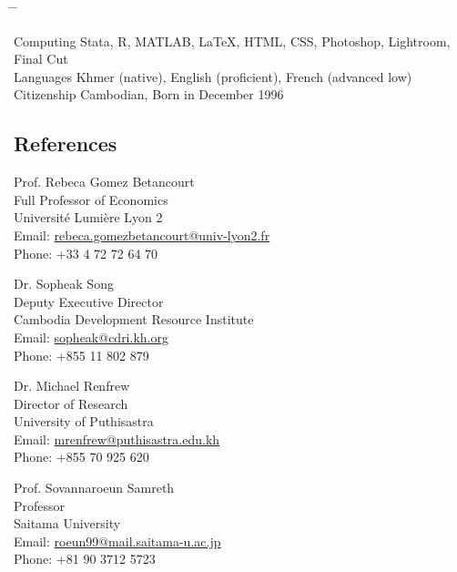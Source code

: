 \documentclass[10pt,a4paper]{article}
\newcommand{\tabbedblock}[1]{

	\begin{tabbing}
		\hspace{2cm} \= \hspace{4cm} \= \kill
		#1
	\end{tabbing}
}
\begin{document}
\tabbedblock{
	Computing \> Stata, R, MATLAB, \LaTeX, HTML, CSS, Photoshop, Lightroom, Final Cut\\
	
	Languages \> Khmer (native), English (proficient), French (advanced low)\\
	
	Citizenship \> Cambodian, Born in December 1996
}


\subsection*{References}		

\parbox{0.5\textwidth}{ %
	Prof. Rebeca Gomez Betancourt\\ 
	Full Professor of Economics\\ 
	Université Lumière Lyon 2\\
	Email: \href{mailto: Phone: rebeca.gomezbetancourt@univ-lyon2.fr}{rebeca.gomezbetancourt@univ-lyon2.fr}\\
	Phone: +33 4 72 72 64 70
}
\hfill %
\parbox{0.5\textwidth}{ %
	Dr. Sopheak Song\\ 
	Deputy Executive Director \\
	Cambodia Development Resource Institute\\ 
	Email: \href{mailto: sopheak@cdri.kh.org}{sopheak@cdri.kh.org}\\
	Phone: +855 11 802 879
}

\vspace{1.5em}

\parbox{0.5\textwidth}{ %
	Dr. Michael Renfrew\\ 
	Director of Research\\
	University of Puthisastra\\ 
	Email: \href{mailto: mrenfrew@puthisastra.edu.kh}{mrenfrew@puthisastra.edu.kh}\\
	Phone: +855 70 925 620
}
\hfill %
\parbox{0.5\textwidth}{ %
	Prof. Sovannaroeun Samreth \\ 
	Professor \\
	Saitama University \\
	Email: \href{mailto: roeun99@mail.saitama-u.ac.jp}{roeun99@mail.saitama-u.ac.jp}\\
	Phone: +81 90 3712 5723
}
\end{document}
